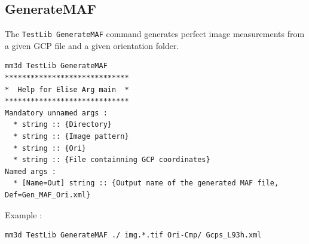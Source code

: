 \subsection{GenerateMAF}
The {\tt TestLib GenerateMAF} command generates perfect image measurements from a given GCP file and a given orientation folder. 

\begin{verbatim}
mm3d TestLib GenerateMAF
*****************************
*  Help for Elise Arg main  *
*****************************
Mandatory unnamed args : 
  * string :: {Directory}
  * string :: {Image pattern}
  * string :: {Ori}
  * string :: {File containning GCP coordinates}
Named args : 
  * [Name=Out] string :: {Output name of the generated MAF file, Def=Gen_MAF_Ori.xml}
\end{verbatim}

Example :
\begin{verbatim}
mm3d TestLib GenerateMAF ./ img.*.tif Ori-Cmp/ Gcps_L93h.xml
\end{verbatim}


